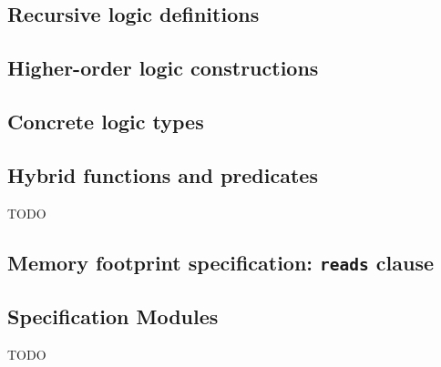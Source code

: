 \subsection{Recursive logic definitions}


\subsection{Higher-order logic constructions}
\label{sec:higherorder}

\absent


\subsection{Concrete logic types}\label{sec:concrete-logic-types}

\absent


\subsection{Hybrid functions and predicates}
\label{sec:logicalstates}

TODO


\subsection{Memory footprint specification: \texorpdfstring{\lstinline|reads|}{reads} clause}

\absent


\subsection{Specification Modules}
\label{sec:specmodules}

TODO



